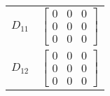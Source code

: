\begin{tabular}{cl}
 $D_{11}$ & $\left[\begin{matrix}0 & 0 & 0\\0 & 0 & 0\\0 & 0 & 0\end{matrix}\right]$                                                                                                                                                                                                                                                                                                                                                                                                                                                                                                                                                                                                                                                                                                                                                                                                                                                                                                                                                                                                                                                                                                                                                                                                                                    \\
 $D_{12}$ & $\left[\begin{matrix}0 & 0 & 0\\0 & 0 & 0\\0 & 0 & 0\end{matrix}\right]$                                                                                                                                                                                                                                                                                                                                                                                                                                                                                                                                                                                                                                                                                                                                                                                                                                                                                                                                                                                                                                                                                                                                                                                                                                    \\

\end{tabular}
